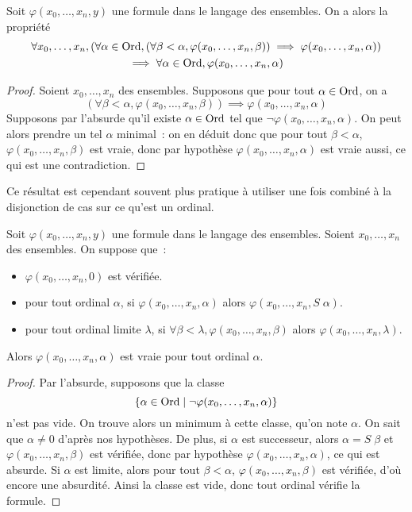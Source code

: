 \begin{theorem}
  Soit $\varphi(x_0,\ldots,x_n,y)$ une formule dans le langage des ensembles.
  On a alors la propriété
  \begin{multline*}
    \forall x_0,\ldots,x_n,(\forall \alpha\in\operatorname{Ord},
    (\forall \beta < \alpha, \varphi(x_0,\ldots,x_n,\beta))\implies
    \varphi(x_0,\ldots,x_n,\alpha))\\
    \implies \forall \alpha \in \operatorname{Ord}, \varphi(x_0,\ldots,x_n,\alpha)
  \end{multline*}
\end{theorem}

\begin{proof}
  Soient $x_0,\ldots,x_n$ des ensembles. Supposons que pour tout
  $\alpha\in\operatorname{Ord}$, on a
  \[(\forall \beta < \alpha, \varphi(x_0,\ldots,x_n,\beta))\implies
  \varphi(x_0,\ldots,x_n,\alpha)\]
  Supposons par l'absurde qu'il existe $\alpha \in \operatorname{Ord}$ tel que
  $\lnot\varphi(x_0,\ldots,x_n,\alpha)$. On peut alors prendre un tel $\alpha$
  minimal~: on en déduit donc que pour tout $\beta < \alpha$,
  $\varphi(x_0,\ldots,x_n,\beta)$ est vraie, donc par hypothèse
  $\varphi(x_0,\ldots,x_n,\alpha)$ est vraie aussi, ce qui est une
  contradiction.
\end{proof}

Ce résultat est cependant souvent plus pratique à utiliser une fois combiné à la
disjonction de cas sur ce qu'est un ordinal.

\begin{proposition}
  Soit $\varphi(x_0,\ldots,x_n,y)$ une formule dans le langage des ensembles.
  Soient $x_0,\ldots,x_n$ des ensembles. On suppose que~:
  \begin{itemize}
  \item $\varphi(x_0,\ldots,x_n,0)$ est vérifiée.
  \item pour tout ordinal $\alpha$, si $\varphi(x_0,\ldots,x_n,\alpha)$ alors
    $\varphi(x_0,\ldots,x_n,S\;\alpha)$.
  \item pour tout ordinal limite $\lambda$, si
    $\forall \beta < \lambda, \varphi(x_0,\ldots,x_n,\beta)$ alors
    $\varphi(x_0,\ldots,x_n,\lambda)$.
  \end{itemize}

  Alors $\varphi(x_0,\ldots,x_n,\alpha)$ est vraie pour tout ordinal $\alpha$.
\end{proposition}

\begin{proof}
  Par l'absurde, supposons que la classe
  \[\{\alpha \in\operatorname{Ord}\mid \mathcal \lnot\varphi(x_0,\ldots,x_n,\alpha)\}\]
  n'est pas vide. On trouve alors un minimum à cette classe, qu'on note
  $\alpha$. On sait que $\alpha \neq 0$ d'après nos hypothèses. De plus, si
  $\alpha$ est successeur, alors $\alpha = S\;\beta$ et
  $\varphi(x_0,\ldots,x_n,\beta)$ est vérifiée, donc par hypothèse
  $\varphi(x_0,\ldots,x_n,\alpha)$, ce qui est absurde. Si $\alpha$ est limite,
  alors pour tout $\beta < \alpha$, $\varphi(x_0,\ldots,x_n,\beta)$ est
  vérifiée, d'où encore une absurdité.
  Ainsi la classe est vide, donc tout ordinal vérifie la formule.
\end{proof}

